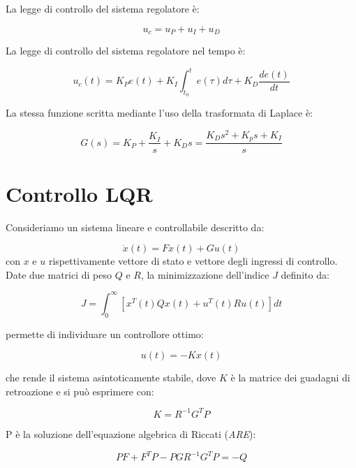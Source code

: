 La legge di controllo del sistema regolatore è:

\begin{equation}
	u_{c}=u_{P}+u_{I}+u_{D}
\end{equation}

La legge di controllo del sistema regolatore nel tempo è:

\begin{equation}
	u_{c}(t) = K_{P}e(t)+K_{I}\int_{t_{0}}^{t}e(\tau)d\tau + K_{D}\dfrac{de(t)}{dt}
\end{equation}

La stessa funzione scritta mediante l'uso della trasformata di Laplace è:

\begin{equation}
	G(s) = K_{P}+\dfrac{K_{I}}{s}+K_{D}s=\dfrac{K_{D}s^{2}+K_{p}s+K_{I}}{s}
\end{equation}


\section{Controllo LQR}

Consideriamo un sistema lineare e controllabile descritto da:

\begin{equation}
	\dot{x}(t) = Fx(t)+Gu(t)
\end{equation}
con $x$ e $u$ rispettivamente vettore di stato e vettore degli ingressi di controllo. Date due matrici di peso $Q$ e $R$, la minimizzazione dell'indice $J$ definito da:

\begin{equation}
	J=\int_{0}^{\infty}[x^{T}(t)Qx(t)+u^{T}(t)Ru(t)]dt
\end{equation}

permette di individuare un controllore ottimo:

\begin{equation}
	u(t) = -Kx(t)
\end{equation}

che rende il sistema asintoticamente stabile, dove $K$ è la matrice dei guadagni di retroazione e si può esprimere con:

\begin{equation}
	K=R^{-1}G^{T}P
\end{equation}

P è la soluzione dell'equazione algebrica di Riccati (\textit{ARE}):

\begin{equation}
	PF+F^{T}P-PGR^{-1}G^{T}P=-Q
\end{equation}










